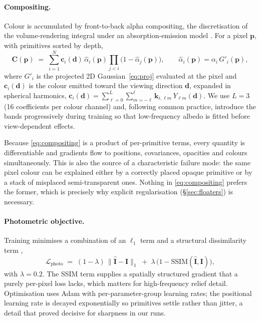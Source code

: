 \paragraph{Compositing.}
Colour is accumulated by front-to-back alpha compositing, the discretisation of
the volume-rendering integral under an absorption-emission model
\cite{max1995optical}. For a pixel $\bm{p}$, with primitives sorted by depth,
\begin{equation}
  \bm{C}(\bm{p}) \;=\; \sum_{i=1}^{N} \bm{c}_i(\bm{d})\,\hat{\alpha}_i(\bm{p})
  \prod_{j<i}\big(1-\hat{\alpha}_j(\bm{p})\big),
  \qquad
  \hat{\alpha}_i(\bm{p}) = \alpha_i\,G'_i(\bm{p}),
  \label{eq:compositing}
\end{equation}
where $G'_i$ is the projected 2D Gaussian~\eqref{eq:proj} evaluated at the pixel
and $\bm{c}_i(\bm{d})$ is the colour emitted toward the viewing direction
$\bm{d}$, expanded in spherical harmonics,
$\bm{c}_i(\bm{d})=\sum_{\ell=0}^{L}\sum_{m=-\ell}^{\ell}\bm{k}_{i,\ell m}\,Y_{\ell m}(\bm{d})$.
We use $L=3$ (16 coefficients per colour channel) and, following common practice,
introduce the bands progressively during training so that low-frequency albedo is
fitted before view-dependent effects.

Because \eqref{eq:compositing} is a product of per-primitive terms, every quantity
is differentiable and gradients flow to positions, covariances, opacities and
colours simultaneously. This is also the source of a characteristic failure mode:
the same pixel colour can be explained either by a correctly placed opaque
primitive or by a stack of misplaced semi-transparent ones. Nothing in
\eqref{eq:compositing} prefers the former, which is precisely why explicit
regularisation (\S\ref{sec:floaters}) is necessary.

\paragraph{Photometric objective.}
Training minimises a combination of an $\ell_1$ term and a structural
dissimilarity term \cite{wang2004ssim},
\begin{equation}
  \mathcal{L}_{\text{photo}} \;=\; (1-\lambda)\,\big\lVert \hat{\bm{I}}-\bm{I}\big\rVert_1
  \;+\; \lambda\,\big(1-\mathrm{SSIM}(\hat{\bm{I}},\bm{I})\big),
  \label{eq:photo}
\end{equation}
with $\lambda=0.2$. The SSIM term supplies a spatially structured gradient that a
purely per-pixel loss lacks, which matters for high-frequency relief detail.
Optimisation uses Adam \cite{kingma2015adam} with per-parameter-group learning
rates; the positional learning rate is decayed exponentially so primitives settle
rather than jitter, a detail that proved decisive for sharpness in our runs.

